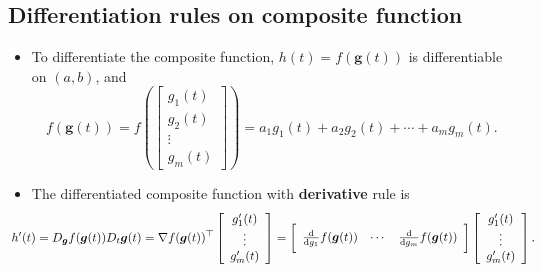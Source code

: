 \documentclass[12pt,thmsa]{article}
\begin{document}
\smallskip

\subsection{Differentiation rules on composite function}
\begin{itemize}
	\item To differentiate the composite function, \( h(t)=f(\boldsymbol{g}(t)) \) is differentiable on \((a, b)\), and
	\[
	f \left( \boldsymbol{g} \left( t \right) 	\right)=
	f \left( \left[
	\begin{array}{c}
		g_{1}( t ) \\
		g_{2}( t ) \\
		\vdots \\
		g_{m}( t )
	\end{array}
	\right]
	\right)
	= a_{1}g_{1}( t ) + a_{2}g_{2}( t ) + \cdots + a_{m}g_{m}( t ).
	\]

	\item The differentiated composite function with \textbf{derivative} rule is 
	\[ \hspace{-0.6cm}
	h^{\prime}(t)=D_{\boldsymbol{g}} f(\boldsymbol{g}(t)) D_{t} \boldsymbol{g}(t)
	=\nabla f(\boldsymbol{g}(t))^{\top}
	\left[\begin{array}{c}
		g_{1}^{\prime}(t) \\
		\vdots \\
		g_{m}^{\prime}(t)
	\end{array}  \right] 
	=  \bigg[ \begin{array}{ccc}
		\frac{\mathrm{d}}{\mathrm{d} g_1} f(\boldsymbol{g}(t)) &
		\cdots &
		\frac{\mathrm{d}}{\mathrm{d} g_m} f(\boldsymbol{g}(t))
	\end{array} \bigg] \left[\begin{array}{c}
		g_{1}^{\prime}(t) \\
		\vdots \\
		g_{m}^{\prime}(t)
	\end{array}  \right]  .
	\]
	

\end{itemize}
\end{document}
